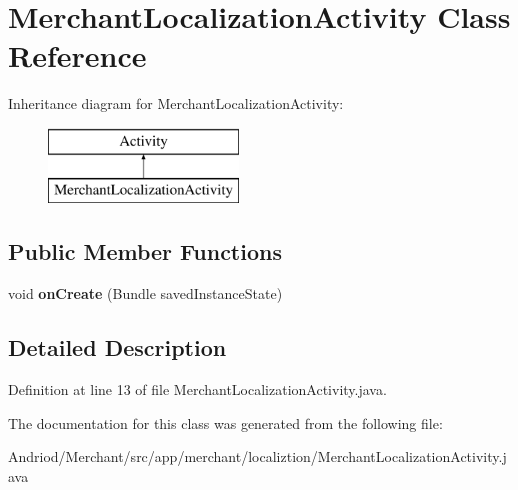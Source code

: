 \hypertarget{classapp_1_1merchant_1_1localiztion_1_1_merchant_localization_activity}{\section{Merchant\-Localization\-Activity Class Reference}
\label{classapp_1_1merchant_1_1localiztion_1_1_merchant_localization_activity}
}
Inheritance diagram for Merchant\-Localization\-Activity\-:\begin{figure}[H]
\begin{center}
\leavevmode
\includegraphics[height=2.000000cm]{classapp_1_1merchant_1_1localiztion_1_1_merchant_localization_activity}
\end{center}
\end{figure}
\subsection*{Public Member Functions}
\begin{DoxyCompactItemize}
\item 
\hypertarget{classapp_1_1merchant_1_1localiztion_1_1_merchant_localization_activity_a85e87cb5ced88dff7c8173ecc4f636d1}{void {\bfseries on\-Create} (Bundle saved\-Instance\-State)}\label{classapp_1_1merchant_1_1localiztion_1_1_merchant_localization_activity_a85e87cb5ced88dff7c8173ecc4f636d1}

\end{DoxyCompactItemize}


\subsection{Detailed Description}


Definition at line 13 of file Merchant\-Localization\-Activity.\-java.



The documentation for this class was generated from the following file\-:\begin{DoxyCompactItemize}
\item 
Andriod/\-Merchant/src/app/merchant/localiztion/Merchant\-Localization\-Activity.\-java\end{DoxyCompactItemize}
